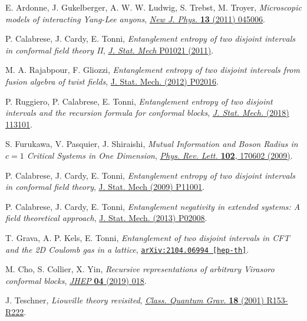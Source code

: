\documentclass[a4paper,11pt]{article}
\begin{document}
\begin{thebibliography}{99}
 E. Ardonne, J. Gukelberger, A. W. W. Ludwig, S. Trebst, M. Troyer, \emph{Microscopic models of interacting Yang-Lee anyons},
\href{https://doi.org/10.1088/1367-2630/13/4/045006}{\emph{New J. Phys.} {\bf 13} (2011) 045006}.

 P. Calabrese, J. Cardy, E. Tonni, \emph{Entanglement entropy of two disjoint intervals in conformal field theory II}, \href{https://doi.org/10.1088/1742-5468/2011/01/P01021}{\emph{J. Stat. Mech} P01021 (2011)}.

 M. A. Rajabpour, F. Gliozzi, \emph{Entanglement entropy of two disjoint intervals from fusion algebra of twist fields},
\href{https://doi.org/10.1088/1742-5468/2012/02/P02016}{J. Stat. Mech. (2012) P02016}.

 P. Ruggiero, P. Calabrese, E. Tonni, \emph{Entanglement entropy of two disjoint intervals and the recursion formula
for conformal blocks}, \href{https://doi.org/10.1088/1742-5468/aae5a8}{\emph{J. Stat. Mech.} (2018) 113101}.

  S. Furukawa, V. Pasquier, J. Shiraishi, \emph{Mutual Information and Boson Radius in $c=1$ Critical Systems in One Dimension}, \href{https://doi.org/10.1103/PhysRevLett.102.170602}{\emph{Phys. Rev. Lett.} {\bf 102}, 170602 (2009)}.

 P. Calabrese, J. Cardy, E. Tonni, \emph{Entanglement entropy of two disjoint intervals in conformal field theory},
\href{https://doi.org/10.1088/1742-5468/2009/11/P11001}{J. Stat. Mech (2009) P11001}.

 P. Calabrese, J. Cardy, E. Tonni, \emph{Entanglement negativity in extended systems:  A field theoretical approach},
\href{https://doi.org/10.1088/1742-5468/2013/02/P02008}{J. Stat. Mech. (2013) P02008}.

 T. Grava, A. P. Kels, E. Tonni, \emph{Entanglement of two disjoint intervals in CFT and the 2D Coulomb gas in a lattice},
\href{https://arxiv.org/abs/2104.06994}{\texttt{arXiv:2104.06994 [hep-th]}}.

 M. Cho, S. Collier, X. Yin, \emph{Recursive representations of arbitrary Virasoro conformal blocks}, 
\href{https://doi.org/10.1007/JHEP04(2019)018}{\emph{JHEP} {\bf 04} (2019) 018}.

 J. Teschner, \emph{Liouville theory revisited}, \href{https://doi.org/10.1088/0264-9381/18/23/201}{\emph{Class. Quantum Grav.} {\bf 18} (2001) R153-R222}.


\end{thebibliography}
\end{document}
